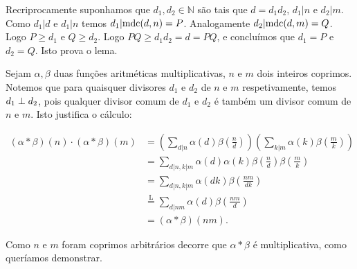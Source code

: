 \documentclass[main.tex]{subfiles}
\renewcommand*{\=}[1]{\ensuremath{\stackrel{\text{#1}}{=}}}
\begin{document}
\begin{solution}
\begin{lemma}
\begin{quickproof}
Recriprocamente suponhamos que $d_1,d_2\in\mathbb{N}$ são tais que $d=d_1d_2$,
$d_1|n$ e $d_2|m$. Como $d_1|d$ e $d_1|n$ temos $d_1|\text{mdc}(d,n)=P$.
Analogamente $d_2|\text{mdc}(d,m)=Q$.
Logo $P\geq d_1$ e $Q\geq d_2$.
Logo $PQ\geq d_1d_2=d=PQ$, e concluímos que $d_1=P$ e $d_2=Q$. Isto prova o lema.
\end{quickproof}
\end{lemma}

Sejam $\alpha,\beta$ duas funções aritméticas multiplicativas, $n$ e $m$ dois inteiros coprimos.
Notemos que para quaisquer divisores $d_1$ e $d_2$ de $n$ e $m$ respetivamente,
temos $d_1\perp d_2$, pois qualquer divisor comum de $d_1$ e $d_2$
é também um divisor comum de $n$ e $m$. Isto justifica o cálculo:

\begin{align*}
(\alpha*\beta)(n)\cdot(\alpha*\beta)(m)
&=\left(\sum_{d|n}\alpha(d)\beta(\frac{n}{d})\right)
\left(\sum_{k|m}\alpha(k)\beta(\frac{m}{k})\right) \\
&=\sum_{d|n,k|m}\alpha(d)\alpha(k)\beta(\frac{n}{d})\beta(\frac{m}{k}) \\
&=\sum_{d|n,k|m}\alpha(dk)\beta(\frac{nm}{dk}) \\
&\={L}\sum_{d|nm}\alpha(d)\beta(\frac{nm}{d}) \\
&=(\alpha*\beta)(nm).
\end{align*}

Como $n$ e $m$ foram coprimos arbitrários decorre que $\alpha*\beta$
é multiplicativa, como queríamos demonstrar.
\end{solution}
\end{document}
